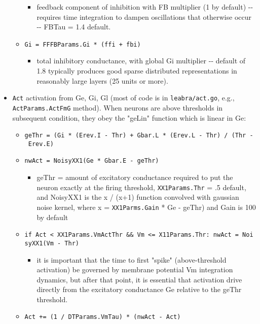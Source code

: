 \begin{itemize}
\begin{itemize}
    \begin{itemize}
    \tightlist
    \item
      feedback component of inhibition with FB multiplier (1 by default)
      -\/- requires time integration to dampen oscillations that
      otherwise occur -\/- FBTau = 1.4 default.
    \end{itemize}
  \item
    \texttt{Gi\ =\ FFFBParams.Gi\ *\ (ffi\ +\ fbi)}

    \begin{itemize}
    \tightlist
    \item
      total inhibitory conductance, with global Gi multiplier -\/-
      default of 1.8 typically produces good sparse distributed
      representations in reasonably large layers (25 units or more).
    \end{itemize}
  \end{itemize}
\item
  \texttt{Act} activation from Ge, Gi, Gl (most of code is in
  \texttt{leabra/act.go}, e.g., \texttt{ActParams.ActFmG} method). When
  neurons are above thresholds in subsequent condition, they obey the
  "geLin" function which is linear in Ge:

  \begin{itemize}
  \tightlist
  \item
    \texttt{geThr\ =\ (Gi\ *\ (Erev.I\ -\ Thr)\ +\ Gbar.L\ *\ (Erev.L\ -\ Thr)\ /\ (Thr\ -\ Erev.E)}
  \item
    \texttt{nwAct\ =\ NoisyXX1(Ge\ *\ Gbar.E\ -\ geThr)}

    \begin{itemize}
    \tightlist
    \item
      geThr = amount of excitatory conductance required to put the
      neuron exactly at the firing threshold, \texttt{XX1Params.Thr} =
      .5 default, and NoisyXX1 is the x / (x+1) function convolved with
      gaussian noise kernel, where x = \texttt{XX1Parms.Gain} * Ge -
      geThr) and Gain is 100 by default
    \end{itemize}
  \item
    \texttt{if\ Act\ \textless{}\ XX1Params.VmActThr\ \&\&\ Vm\ \textless{}=\ X11Params.Thr:\ nwAct\ =\ NoisyXX1(Vm\ -\ Thr)}

    \begin{itemize}
    \tightlist
    \item
      it is important that the time to first "spike" (above-threshold
      activation) be governed by membrane potential Vm integration
      dynamics, but after that point, it is essential that activation
      drive directly from the excitatory conductance Ge relative to the
      geThr threshold.
    \end{itemize}
  \item
    \texttt{Act\ +=\ (1\ /\ DTParams.VmTau)\ *\ (nwAct\ -\ Act)}


\end{itemize}
\end{itemize}

